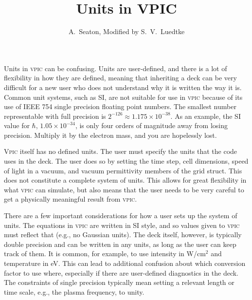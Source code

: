 \documentclass[twocolumn,10pt]{article}
\title{Units in VPIC}
\author{A.~Seaton, Modified by S.~V.~Luedtke}
\begin{document}
	\maketitle


Units in \textsc{vpic} can be confusing.
Units are user-defined, and there is a lot of flexibility in how they are defined, meaning that inheriting a deck can be very difficult for a new user who does not understand why it is written the way it is.
Common unit systems, such as SI, are not suitable for use in \textsc{vpic} because of its use of IEEE 754 single precision floating point numbers.
The smallest number representable with full precision is $2^{-126} \approx 1.175\times 10^{-38}$.
As an example, the SI value for $\hbar$, $1.05\times 10^{-34}$, is only four orders of magnitude away from losing precision.  Multiply it by the electron mass, and you are hopelessly lost.
%

\textsc{Vpic} itself has no defined units.
The user must specify the units that the code uses in the deck.
The user does so by setting the time step, cell dimensions, speed of light in a vacuum, and vacuum permittivity members of the grid struct.
This does not constitute a complete system of units.
This allows for great flexibility in what \textsc{vpic} can simulate, but also means that the user needs to be very careful to get a physically meaningful result from \textsc{vpic}.

There are a few important considerations for how a user sets up the system of units.
The equations in \textsc{vpic} are written in SI style, and so values given to \textsc{vpic} must reflect that (e.g., no Gaussian units).
The deck itself, however, is typically double precision and can be written in any units, as long as the user can keep track of them.
It is common, for example, to use intensity in W/cm$^2$ and temperature in eV.
This can lead to additional confusion about which conversion factor to use where, especially if there are user-defined diagnostics in the deck.
The constraints of single precision typically mean setting a relevant length or time scale, e.g., the plasma frequency, to unity.
\end{document}
